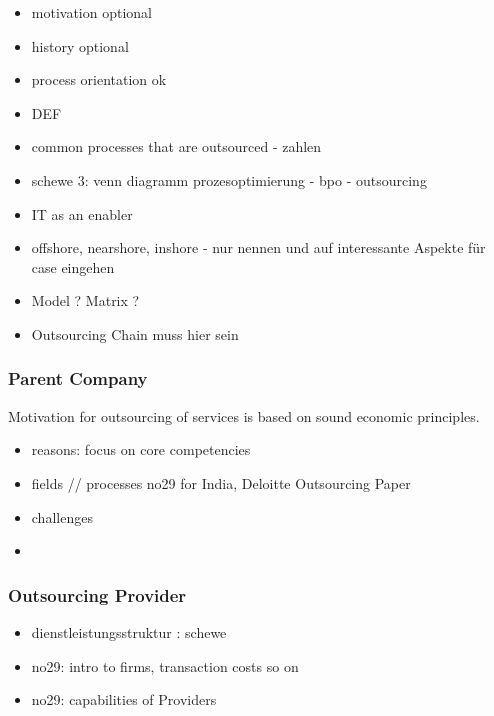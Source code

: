 			
		\begin{itemize}
			\item motivation optional 
			\item history optional
			\item process orientation  ok
			\item DEF
			\item common processes that are outsourced - zahlen
			\item schewe 3: venn diagramm prozesoptimierung - bpo - outsourcing
			
			\item IT as an enabler
			\item offshore, nearshore, inshore - nur nennen und auf interessante Aspekte für case eingehen
			\item Model ? Matrix ? 
			\item Outsourcing Chain muss hier sein 
		\end{itemize}
	
		\subsubsection{Parent Company}
		Motivation for outsourcing of services is based on sound economic principles. 
		\begin{itemize}
			\item reasons: focus on core competencies
			\item fields // processes no29 for India, Deloitte Outsourcing Paper
			\item challenges
			\item 
		\end{itemize}
		\subsubsection{Outsourcing Provider}
		
		\begin{itemize}
			\item dienstleistungsstruktur  : schewe
			\item no29: intro to firms, transaction costs so on
			\item no29: capabilities of Providers
		\end{itemize}
